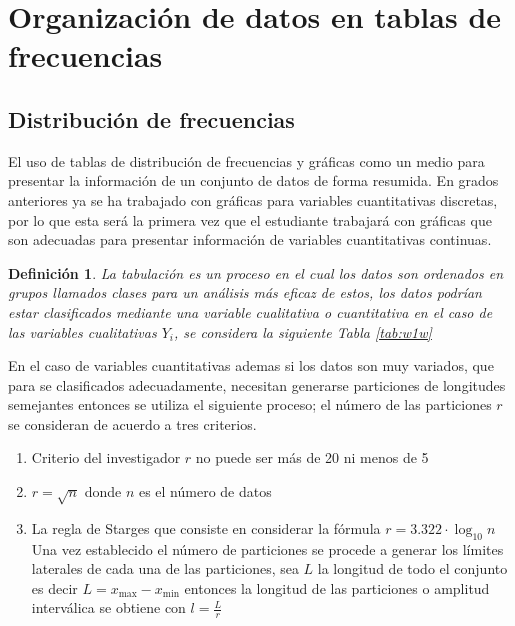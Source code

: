\documentclass[a4paper]{report}
\newtheorem{defn}[thm]{Definición}
\begin{document}
\section{Organización de datos en tablas de frecuencias}
\subsection{Distribución de frecuencias}
El uso de tablas de distribución de frecuencias y gráficas como un medio para presentar la información
de un conjunto de datos de forma resumida. En grados anteriores ya se ha trabajado con gráficas para
variables cuantitativas discretas, por lo que esta será la primera vez que el estudiante trabajará con
gráficas que son adecuadas para presentar información de variables cuantitativas continuas.

\begin{defn}
	La tabulación es un proceso en el cual los datos son ordenados en grupos llamados clases para un análisis más eficaz de estos, los datos podrían estar clasificados mediante una variable cualitativa o cuantitativa en el caso de las variables cualitativas $Y_i$, se considera la siguiente Tabla \ref{tab:w1w}
\end{defn}


En el caso de variables cuantitativas ademas si los datos son muy variados, que para se clasificados adecuadamente, necesitan generarse particiones de longitudes semejantes entonces se utiliza el siguiente proceso; el número de las particiones $r$ se consideran de acuerdo a tres criterios.
\begin{enumerate}
	\item Criterio del investigador $r$ no puede ser más de 20 ni menos de 5
	\item $r=\sqrt{n}$ donde $n$ es el número de datos
	\item La regla de Starges que consiste en considerar la fórmula $r=3.322\cdot\log_{10} n$ Una vez establecido el número de particiones se procede a generar los límites laterales de cada una de las particiones, sea $L$ la longitud de todo el conjunto es decir $L=x_{\text{max}}-x_{\text{min}}$ entonces la longitud de las particiones o amplitud interválica se obtiene con $l=\frac{L}{r}$
\end{enumerate}
\end{document}
